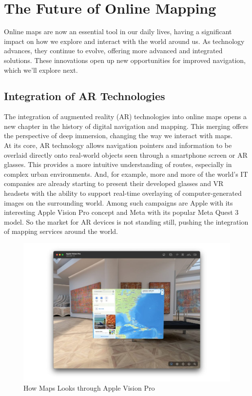 \documentclass[10pt,oneside,english,a4paper]{article}
\begin{document}
\section{The Future of Online Mapping} \label{future}
Online maps are now an essential tool in our daily lives, having a significant impact on how we explore and interact with the world around us. As technology advances, they continue to evolve, offering more advanced and integrated solutions. These innovations open up new opportunities for improved navigation, which we'll explore next.

\subsection{Integration of AR Technologies} \label {future:ar}
The integration of augmented reality (AR) technologies into online maps opens a new chapter in the history of digital navigation and mapping. This merging offers the perspective of deep immersion, changing the way we interact with maps. 
\\At its core, AR technology allows navigation pointers and information to be overlaid directly onto real-world objects seen through a smartphone screen or AR glasses. This provides a more intuitive understanding of routes, especially in complex urban environments. And, for example, more and more of the world's IT companies are already starting to present their developed glasses and VR headsets with the ability to support real-time overlaying of computer-generated images on the surrounding world. Among such campaigns are Apple with its interesting Apple Vision Pro concept and Meta with its popular Meta Quest 3 model. So the market for AR devices is not standing still, pushing the integration of mapping services around the world.

\begin{figure}[h]
	\centering
	\includegraphics[scale = 0.37]{diagram7.jpg}
	\caption{How Maps Looks through Apple Vision Pro}
	\label{fig:apple}
\end{figure}
\end{document}
